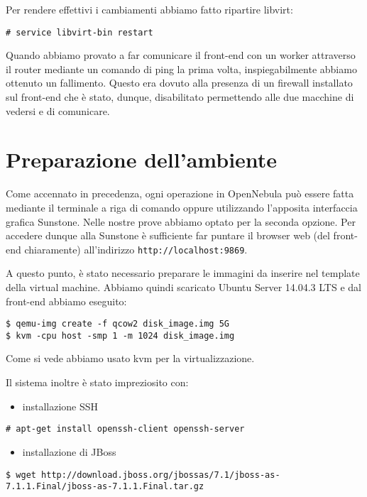 \documentclass[twoside]{article}
\begin{document}
Per rendere effettivi i cambiamenti abbiamo fatto ripartire libvirt:
\begin{lstlisting}[frame=trBL]
# service libvirt-bin restart
\end{lstlisting}

Quando abbiamo provato a far comunicare il front-end con un worker attraverso il router
mediante un comando di ping la prima volta, inspiegabilmente abbiamo ottenuto un fallimento. Questo
era dovuto alla presenza di un firewall installato sul front-end che è stato, dunque, disabilitato
permettendo alle due macchine di vedersi e di comunicare.

\section{Preparazione dell'ambiente}
Come accennato in precedenza, ogni operazione in OpenNebula può essere fatta mediante
il terminale a riga di comando oppure utilizzando l'apposita interfaccia grafica Sunstone. Nelle nostre
prove abbiamo optato per la seconda opzione. Per accedere dunque alla Sunstone è sufficiente far puntare il
browser web (del front-end chiaramente) all'indirizzo \texttt{http://localhost:9869}.

A questo punto, è stato necessario preparare le immagini da inserire nel template della virtual machine.
Abbiamo quindi scaricato Ubuntu Server 14.04.3 LTS e dal front-end abbiamo eseguito:
\begin{lstlisting}[frame=trBL]
$ qemu-img create -f qcow2 disk_image.img 5G
$ kvm -cpu host -smp 1 -m 1024 disk_image.img
\end{lstlisting}
Come si vede abbiamo usato kvm \cite{bib:kvm} per la virtualizzazione.

Il sistema inoltre è stato impreziosito con:
\begin{itemize}
	\item installazione SSH
\end{itemize}
\begin{lstlisting}[frame=trBL]
# apt-get install openssh-client openssh-server
\end{lstlisting}
\begin{itemize}
\item installazione di JBoss
\end{itemize}		  
\begin{lstlisting}[frame=trBL]
$ wget http://download.jboss.org/jbossas/7.1/jboss-as-7.1.1.Final/jboss-as-7.1.1.Final.tar.gz		  
\end{lstlisting}
\end{document}
